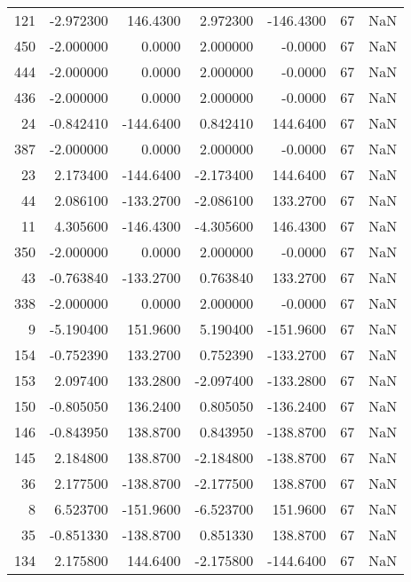 \begin{tabular}{rrrrrrr}
121 &   -2.972300 &  146.4300 &    2.972300 &   -146.4300 &          67 & NaN \\
450 &   -2.000000 &    0.0000 &    2.000000 &     -0.0000 &          67 & NaN \\
444 &   -2.000000 &    0.0000 &    2.000000 &     -0.0000 &          67 & NaN \\
436 &   -2.000000 &    0.0000 &    2.000000 &     -0.0000 &          67 & NaN \\
 24 &   -0.842410 & -144.6400 &    0.842410 &    144.6400 &          67 & NaN \\
387 &   -2.000000 &    0.0000 &    2.000000 &     -0.0000 &          67 & NaN \\
 23 &    2.173400 & -144.6400 &   -2.173400 &    144.6400 &          67 & NaN \\
 44 &    2.086100 & -133.2700 &   -2.086100 &    133.2700 &          67 & NaN \\
 11 &    4.305600 & -146.4300 &   -4.305600 &    146.4300 &          67 & NaN \\
350 &   -2.000000 &    0.0000 &    2.000000 &     -0.0000 &          67 & NaN \\
 43 &   -0.763840 & -133.2700 &    0.763840 &    133.2700 &          67 & NaN \\
338 &   -2.000000 &    0.0000 &    2.000000 &     -0.0000 &          67 & NaN \\
  9 &   -5.190400 &  151.9600 &    5.190400 &   -151.9600 &          67 & NaN \\
154 &   -0.752390 &  133.2700 &    0.752390 &   -133.2700 &          67 & NaN \\
153 &    2.097400 &  133.2800 &   -2.097400 &   -133.2800 &          67 & NaN \\
150 &   -0.805050 &  136.2400 &    0.805050 &   -136.2400 &          67 & NaN \\
146 &   -0.843950 &  138.8700 &    0.843950 &   -138.8700 &          67 & NaN \\
145 &    2.184800 &  138.8700 &   -2.184800 &   -138.8700 &          67 & NaN \\
 36 &    2.177500 & -138.8700 &   -2.177500 &    138.8700 &          67 & NaN \\
  8 &    6.523700 & -151.9600 &   -6.523700 &    151.9600 &          67 & NaN \\
 35 &   -0.851330 & -138.8700 &    0.851330 &    138.8700 &          67 & NaN \\
134 &    2.175800 &  144.6400 &   -2.175800 &   -144.6400 &          67 & NaN \\

\end{tabular}
